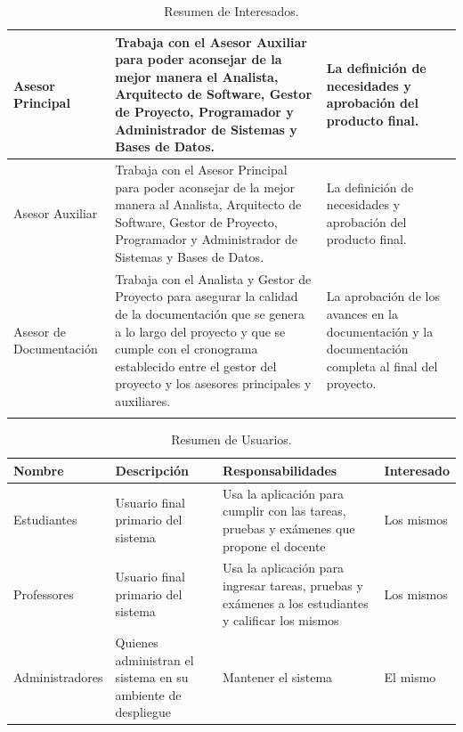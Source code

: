 \begin{longtable}{|p{}|p{}|p{}|}
  \hline
  Asesor Principal & Trabaja con el Asesor Auxiliar para poder aconsejar de la mejor manera el Analista, Arquitecto de Software, Gestor de Proyecto, Programador y Administrador de Sistemas y Bases de Datos. & La definición de necesidades y aprobación del producto final. \\
  \hline
  Asesor Auxiliar & Trabaja con el Asesor Principal para poder aconsejar de la mejor manera al Analista, Arquitecto de Software, Gestor de Proyecto, Programador y Administrador de Sistemas y Bases de Datos. & La definición de necesidades y aprobación del producto final. \\
  \hline
  Asesor de Documentación & Trabaja con el Analista y Gestor de Proyecto para asegurar la calidad de la documentación que se genera a lo largo del proyecto y que se cumple con el cronograma establecido entre el gestor del proyecto y los asesores principales y auxiliares. & La aprobación de los avances en la documentación y la documentación completa al final del proyecto. \\
  \hline
  \caption{Resumen de Interesados.}
  \label{res-inter}
\end{longtable}

\begin{table}[h!]
  \begin{tabular}{|p{}|p{}|p{}|p{}|}
    \hline
    \textbf{Nombre} & \textbf{Descripción} & \textbf{Responsabilidades} & \textbf{Interesado} \\
    \hline
    Estudiantes & Usuario final primario del sistema & Usa la aplicación para cumplir con las tareas, pruebas y exámenes que propone el docente & Los mismos \\
    \hline
    Professores & Usuario final primario del sistema & Usa la aplicación para ingresar tareas, pruebas y exámenes a los estudiantes y calificar los mismos & Los mismos \\
    \hline
    Administradores & Quienes administran el sistema en su ambiente de despliegue & Mantener el sistema & El mismo \\
    \hline
  \end{tabular}
  \caption{Resumen de Usuarios.}
  \label{res-user}
\end{table}

